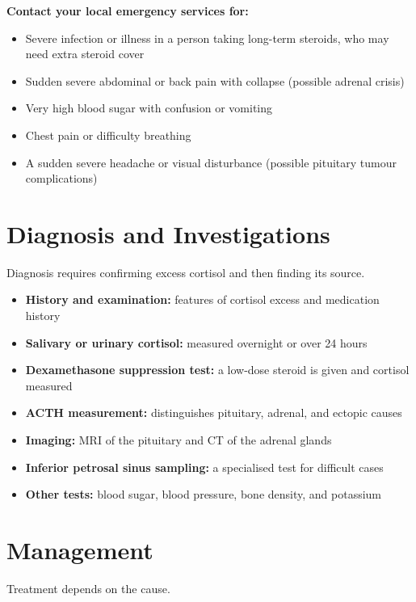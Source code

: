 \textbf{Contact your local emergency services for:}
\begin{itemize}
    \item Severe infection or illness in a person taking long-term steroids, who may need extra steroid cover
    \item Sudden severe abdominal or back pain with collapse (possible adrenal crisis)
    \item Very high blood sugar with confusion or vomiting
    \item Chest pain or difficulty breathing
    \item A sudden severe headache or visual disturbance (possible pituitary tumour complications)
\end{itemize}

\section*{Diagnosis and Investigations}
Diagnosis requires confirming excess cortisol and then finding its source.

\begin{itemize}
    \item \textbf{History and examination:} features of cortisol excess and medication history
    \item \textbf{Salivary or urinary cortisol:} measured overnight or over 24 hours
    \item \textbf{Dexamethasone suppression test:} a low-dose steroid is given and cortisol measured
    \item \textbf{ACTH measurement:} distinguishes pituitary, adrenal, and ectopic causes
    \item \textbf{Imaging:} MRI of the pituitary and CT of the adrenal glands
    \item \textbf{Inferior petrosal sinus sampling:} a specialised test for difficult cases
    \item \textbf{Other tests:} blood sugar, blood pressure, bone density, and potassium
\end{itemize}

\section*{Management}
Treatment depends on the cause.

